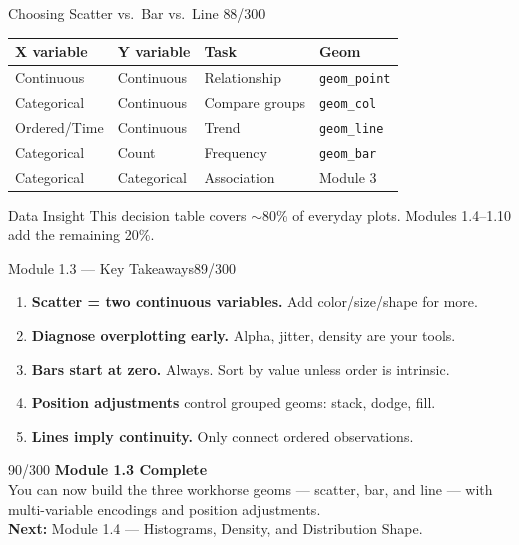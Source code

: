 \documentclass[10pt]{beamer}
\newcommand{\smark}[1]{\hfill{\scriptsize\color{codegray}#1}}
\begin{document}
\begin{frame}{Choosing Scatter vs.\ Bar vs.\ Line}
\smark{88/300}
\centering\small
\begin{tabular}{@{}l l l l@{}}
    \toprule
    \textbf{X variable} & \textbf{Y variable} & \textbf{Task} & \textbf{Geom} \\
    \midrule
    Continuous  & Continuous  & Relationship    & \texttt{geom\_point} \\
    Categorical & Continuous  & Compare groups  & \texttt{geom\_col} \\
    Ordered/Time& Continuous  & Trend           & \texttt{geom\_line} \\
    Categorical & Count       & Frequency       & \texttt{geom\_bar} \\
    Categorical & Categorical & Association     & Module 3 \\
    \bottomrule
\end{tabular}

\vspace{0.3cm}
\begin{exampleblock}{Data Insight}
    \scriptsize This decision table covers $\sim$80\% of everyday plots. Modules 1.4--1.10 add the remaining 20\%.
\end{exampleblock}
\end{frame}

\begin{frame}{Module 1.3 --- Key Takeaways}\smark{89/300}
\begin{enumerate}
    \item \textbf{Scatter = two continuous variables.} Add color/size/shape for more.
    \item \textbf{Diagnose overplotting early.} Alpha, jitter, density are your tools.
    \item \textbf{Bars start at zero.} Always. Sort by value unless order is intrinsic.
    \item \textbf{Position adjustments} control grouped geoms: stack, dodge, fill.
    \item \textbf{Lines imply continuity.} Only connect ordered observations.
\end{enumerate}
\end{frame}

\begin{frame}{}\smark{90/300}
\centering\vspace{1.5cm}
{\Large\textbf{Module 1.3 Complete}}\\[0.5cm]
You can now build the three workhorse geoms --- scatter, bar, and line --- with multi-variable encodings and position adjustments.\\[0.5cm]
\textbf{Next:} Module 1.4 --- Histograms, Density, and Distribution Shape.
\end{frame}
\end{document}

